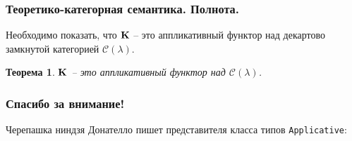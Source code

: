 \documentclass[10pt,pdf,utf8,russian,aspectratio=169]{beamer}
\newtheorem{theor}{Теорема}
\begin{document}
\begin{frame}
  \frametitle{Теоретико-категорная семантика. Полнота.}

Необходимо показать, что ${\bf K}$ -- это аппликативный функтор над декартово замкнутой категорией $\mathcal{C}(\lambda)$.

\begin{theor}
  ${\bf K}$ -- это аппликативный функтор над $\mathcal{C}(\lambda)$.
\end{theor}

\end{frame}


\begin{frame}
  \frametitle{Спасибо за внимание!}

  Черепашка ниндзя Донателло пишет представителя класса типов \verb"Applicative":


\end{frame}
\end{document}

